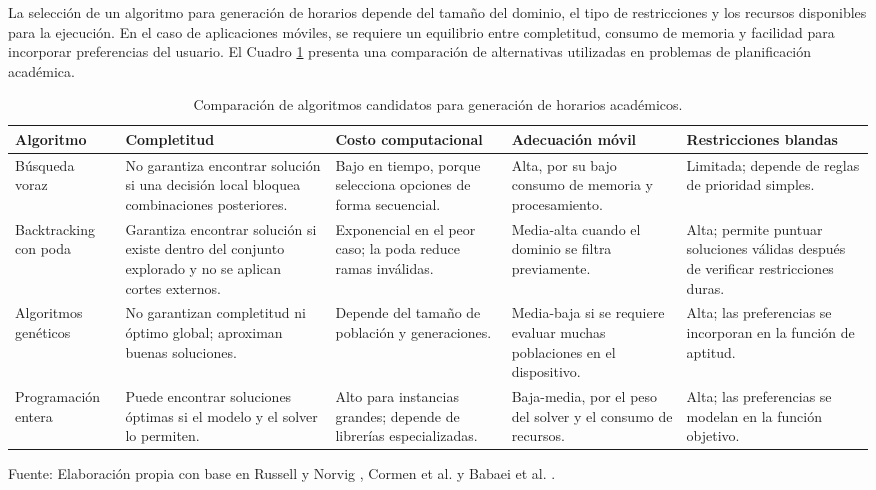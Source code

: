 La selección de un algoritmo para generación de horarios depende del tamaño del dominio, el tipo de restricciones y los recursos disponibles para la ejecución. En el caso de aplicaciones móviles, se requiere un equilibrio entre completitud, consumo de memoria y facilidad para incorporar preferencias del usuario. El Cuadro \ref{tab:comparacion_algoritmos_horarios} presenta una comparación de alternativas utilizadas en problemas de planificación académica.

\begin{table}[H]
\centering
\begin{tabularx}{\linewidth}{p{2.7cm} p{3cm} p{3cm} p{3cm} p{2.7cm}}
\toprule
Algoritmo & Completitud & Costo computacional & Adecuación móvil & Restricciones blandas \\
\midrule
Búsqueda voraz & No garantiza encontrar solución si una decisión local bloquea combinaciones posteriores. & Bajo en tiempo, porque selecciona opciones de forma secuencial. & Alta, por su bajo consumo de memoria y procesamiento. & Limitada; depende de reglas de prioridad simples. \\
Backtracking con poda & Garantiza encontrar solución si existe dentro del conjunto explorado y no se aplican cortes externos. & Exponencial en el peor caso; la poda reduce ramas inválidas. & Media-alta cuando el dominio se filtra previamente. & Alta; permite puntuar soluciones válidas después de verificar restricciones duras. \\
Algoritmos genéticos & No garantizan completitud ni óptimo global; aproximan buenas soluciones. & Depende del tamaño de población y generaciones. & Media-baja si se requiere evaluar muchas poblaciones en el dispositivo. & Alta; las preferencias se incorporan en la función de aptitud. \\
Programación entera & Puede encontrar soluciones óptimas si el modelo y el solver lo permiten. & Alto para instancias grandes; depende de librerías especializadas. & Baja-media, por el peso del solver y el consumo de recursos. & Alta; las preferencias se modelan en la función objetivo. \\
\bottomrule
\end{tabularx}
\caption{Comparación de algoritmos candidatos para generación de horarios académicos.}\label{tab:comparacion_algoritmos_horarios}
Fuente: Elaboración propia con base en Russell y Norvig \cite{russell2021ai}, Cormen et al. \cite{cormen_algorithms} y Babaei et al. \cite{babaei2015-survey}.
\end{table}

